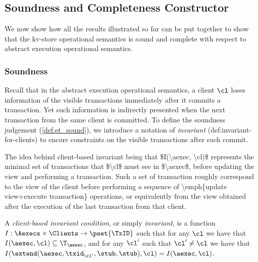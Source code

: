 \subsection{Soundness and Completeness Constructor}
\label{sec:kv2aexec-sound-complete}

We now show how all the results illustrated so far 
can be put together to show that the kv-store operational semantics 
is sound and complete with respect to abstract execution operational semantics.

\subsubsection{Soundness}
Recall that in the abstract execution operational semantics,
a client \( \cl \) loses information of the visible transactions immediately after it commits a transaction.
Yet such information is indirectly presented when the next transaction from the same client is committed.
To define the soundness judgement (\cref{def:et_sound}), we introduce a notation of \emph{invariant} ({def:invariant-for-clients})
to encore constraints on the visible transactions after each commit.

\ac{The idea behind client-based invariant being that $I(\aexec, \cl)$ represents 
the minimal set of transactions that $\cl$ must see in $\aexec$, before 
updating the view and performing a transaction. Such a set of transaction 
roughly correspond to the view of the client before performing a 
sequence of \emph{update view+execute transaction} operations, 
or equivalently from the view obtained after the execution of the 
last transaction from that client.}

\begin{definition}
\label{def:invariant-for-clients}
A \emph{client-based invariant condition}, or simply \emph{invariant}, is a 
function $I : \Aexecs \times \Clients \rightarrow \pset{\TxID}$ 
such that for any $\cl$ we have that $I(\aexec, \cl) \subseteq \T_{\aexec}$, and 
for any  $\cl'$ such that $\cl' \neq \cl$ we have that 
$I(\extend(\aexec, \txid_{\cl'}^{\cdot}, \stub, \stub), \cl) = I(\aexec, \cl)$.
\end{definition}



